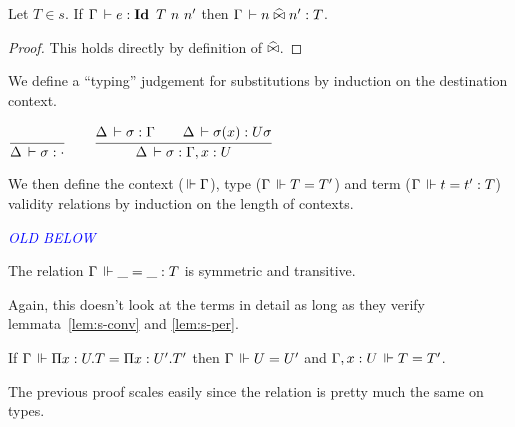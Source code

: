 \documentclass[a4paper,english]{lipics-utf8x}
\newcommand\meta[1]{\noindent\textcolor{blue}{\emph{#1}}}
\begin{document}
  \begin{lemma}
    Let $T \in s$.
    If $\Gamma \,\vdash e : \operatorname{\mathbf{Id}~} T\ n\ n'$ then $\Gamma \,\vdash n \mathrel{\widehat{\bowtie}} n' : T$.
  \end{lemma}

  \begin{proof}
    This holds directly by definition of $\mathrel{\widehat{\bowtie}}$.
  \end{proof}


  We define a ``typing'' judgement for substitutions by induction on the
  destination context.
  \begin{center}
  \(
    \ru{}{\Delta \der \sigma : \cdot}
    \qquad
    \ru{\Delta \der \sigma : \Gamma \qquad
        \Delta \der \sigma(x) : U \sigma
      }{\Delta \der \sigma : \Gamma, x:U}
  \)
  \end{center}

  We then define the context ($\,\Vdash \Gamma$), type ($\Gamma \,\Vdash T = T'$) and
  term ($\Gamma \,\Vdash t = t' : T$) validity relations by induction on the length
  of contexts.

  \begin{mathc}
    \ru{}{\Der \cdot}
    \qquad
    \qquad
    \qquad
  \end{mathc}

  \begin{mathc}
    \qquad
  \end{mathc}

  \meta{OLD BELOW}

  \begin{lemma}
    The relation $\Gamma \,\Vdash \_ = \_ : T$ is symmetric and transitive.
  \end{lemma}
  Again, this doesn't look at the terms in detail as long as they verify
  lemmata~\ref{lem:s-conv} and \ref{lem:s-per}.

  \begin{lemma}
    \label{lem:fun-inj-valid}
    If $\Gamma \,\Vdash \Pi x:U.T = \Pi x:U'.T'$ then $\Gamma \,\Vdash U = U'$ and
    $\Gamma, x:U \,\Vdash T = T'$.
  \end{lemma}
  The previous proof scales easily since the relation is pretty much the same
  on types.
\end{document}
